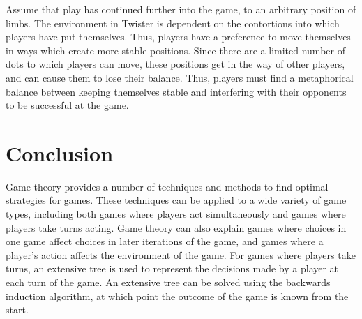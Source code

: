 Assume that play has continued further into the game, to an arbitrary position of limbs. The environment in Twister is dependent on the contortions into which players have put themselves. Thus, players have a preference to move themselves in ways which create more stable positions. Since there are a limited number of dots to which players can move, these positions get in the way of other players, and can cause them to lose their balance. Thus, players must find a metaphorical balance between keeping themselves stable and interfering with their opponents to be successful at the game.

\section{Conclusion}
Game theory provides a number of techniques and methods to find optimal strategies for games. These techniques can be applied to a wide variety of game types, including both games where players act simultaneously and games where players take turns acting. Game theory can also explain games where choices in one game affect choices in later iterations of the game, and games where a player's action affects the environment of the game. For games where players take turns, an extensive tree is used to represent the decisions made by a player at each turn of the game. An extensive tree can be solved using the backwards induction algorithm, at which point the outcome of the game is known from the start.\\